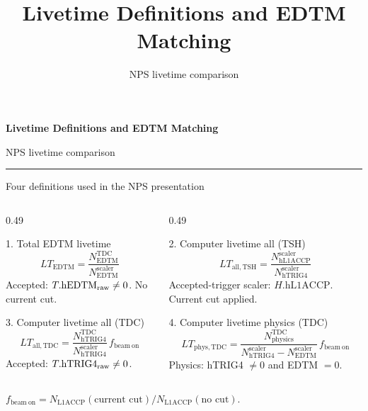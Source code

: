 \documentclass[aspectratio=169,11pt]{beamer}
\title{Livetime Definitions and EDTM Matching}
\subtitle{NPS livetime comparison}
\date{}
\newcommand{\beamOn}{f_{\mathrm{beam\ on}}}
\begin{document}
\begin{frame}[plain]
  \centering
  \vspace{1.5cm}
  {\color{NPSBlue}\LARGE\bfseries Livetime Definitions and EDTM Matching\par}
  \vspace{0.45cm}
  {\large NPS livetime comparison\par}
  \vspace{0.7cm}
  {\color{NPSTeal}\rule{0.45\textwidth}{1.5pt}}
\end{frame}

\begin{frame}{Four definitions used in the NPS presentation}
\small
\begin{columns}[T,onlytextwidth]
  \begin{column}{0.49\textwidth}
    \begin{block}{1. Total EDTM livetime}
      \[
      LT_{\mathrm{EDTM}}=
      \frac{N_{\mathrm{EDTM}}^{\mathrm{TDC}}}
           {N_{\mathrm{EDTM}}^{\mathrm{scaler}}}
      \]
      \scriptsize Accepted: \(T.\mathrm{hEDTM}_{\rm raw}\neq0\). No current cut.
    \end{block}
    \begin{block}{3. Computer livetime all (TDC)}
      \[
      LT_{\mathrm{all,TDC}}=
      \frac{N_{\mathrm{hTRIG4}}^{\mathrm{TDC}}}
           {N_{\mathrm{hTRIG4}}^{\mathrm{scaler}}}\,\beamOn
      \]
      \scriptsize Accepted: \(T.\mathrm{hTRIG4}_{\rm raw}\neq0\).
    \end{block}
  \end{column}
  \begin{column}{0.49\textwidth}
    \begin{block}{2. Computer livetime all (TSH)}
      \[
      LT_{\mathrm{all,TSH}}=
      \frac{N_{\mathrm{hL1ACCP}}^{\mathrm{scaler}}}
           {N_{\mathrm{hTRIG4}}^{\mathrm{scaler}}}
      \]
      \scriptsize Accepted-trigger scaler: \(H.\mathrm{hL1ACCP}\). Current cut applied.
    \end{block}
    \begin{block}{4. Computer livetime physics (TDC)}
      \[
      LT_{\mathrm{phys,TDC}}=
      \frac{N_{\mathrm{physics}}^{\mathrm{TDC}}}
           {N_{\mathrm{hTRIG4}}^{\mathrm{scaler}}-N_{\mathrm{EDTM}}^{\mathrm{scaler}}}\,\beamOn
      \]
      \scriptsize Physics: hTRIG4 \(\neq0\) and EDTM \(=0\).
    \end{block}
  \end{column}
\end{columns}
\vspace{-1mm}
\centering\scriptsize
\(\displaystyle \beamOn=
N_{\mathrm{L1ACCP}}(\text{current cut})/N_{\mathrm{L1ACCP}}(\text{no cut})\).
\end{frame}
\end{document}
